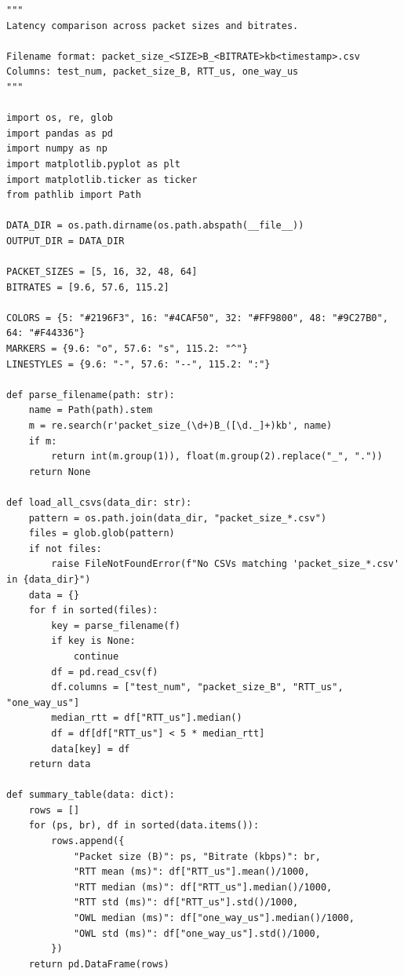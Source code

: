 \begin{lstlisting}[style=appendix-py, caption={Latency vs.\ packet-size plotting}, label={lst:latency-pktsize-plot}]
"""
Latency comparison across packet sizes and bitrates.

Filename format: packet_size_<SIZE>B_<BITRATE>kb<timestamp>.csv
Columns: test_num, packet_size_B, RTT_us, one_way_us
"""

import os, re, glob
import pandas as pd
import numpy as np
import matplotlib.pyplot as plt
import matplotlib.ticker as ticker
from pathlib import Path

DATA_DIR = os.path.dirname(os.path.abspath(__file__))
OUTPUT_DIR = DATA_DIR

PACKET_SIZES = [5, 16, 32, 48, 64]
BITRATES = [9.6, 57.6, 115.2]

COLORS = {5: "#2196F3", 16: "#4CAF50", 32: "#FF9800", 48: "#9C27B0", 64: "#F44336"}
MARKERS = {9.6: "o", 57.6: "s", 115.2: "^"}
LINESTYLES = {9.6: "-", 57.6: "--", 115.2: ":"}

def parse_filename(path: str):
    name = Path(path).stem
    m = re.search(r'packet_size_(\d+)B_([\d._]+)kb', name)
    if m:
        return int(m.group(1)), float(m.group(2).replace("_", "."))
    return None

def load_all_csvs(data_dir: str):
    pattern = os.path.join(data_dir, "packet_size_*.csv")
    files = glob.glob(pattern)
    if not files:
        raise FileNotFoundError(f"No CSVs matching 'packet_size_*.csv' in {data_dir}")
    data = {}
    for f in sorted(files):
        key = parse_filename(f)
        if key is None:
            continue
        df = pd.read_csv(f)
        df.columns = ["test_num", "packet_size_B", "RTT_us", "one_way_us"]
        median_rtt = df["RTT_us"].median()
        df = df[df["RTT_us"] < 5 * median_rtt]
        data[key] = df
    return data

def summary_table(data: dict):
    rows = []
    for (ps, br), df in sorted(data.items()):
        rows.append({
            "Packet size (B)": ps, "Bitrate (kbps)": br,
            "RTT mean (ms)": df["RTT_us"].mean()/1000,
            "RTT median (ms)": df["RTT_us"].median()/1000,
            "RTT std (ms)": df["RTT_us"].std()/1000,
            "OWL median (ms)": df["one_way_us"].median()/1000,
            "OWL std (ms)": df["one_way_us"].std()/1000,
        })
    return pd.DataFrame(rows)


\end{lstlisting}
